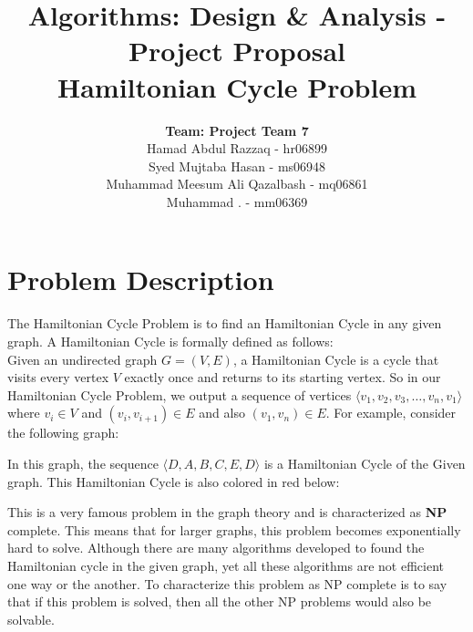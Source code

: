 \documentclass[12pt]{article}
\title{Algorithms: Design \& Analysis - Project Proposal\\\textbf{Hamiltonian Cycle Problem}}
\author{\textbf{Team: Project Team 7}\\Hamad Abdul Razzaq - hr06899 \\Syed Mujtaba Hasan - ms06948 \\Muhammad Meesum Ali Qazalbash - mq06861\\Muhammad . - mm06369}
\date{}
\begin{document}
\maketitle

\section*{Problem Description}
The Hamiltonian Cycle Problem is to find an Hamiltonian Cycle in any given graph. A Hamiltonian Cycle is formally defined as follows:\\
Given an undirected graph $G = \left(V, E\right)$, a Hamiltonian Cycle is a cycle that visits every vertex $V$ exactly once and returns to its starting vertex. So in our Hamiltonian Cycle Problem, we output a sequence of vertices $\langle v_1, v_2, v_3, \ldots, v_n, v_1 \rangle$ where $v_i \in V$ and $(v_i, v_{i+1}) \in E$ and also $(v_1, v_n) \in E$. For example, consider the following graph: \\
\begin{center}
\end{center}
In this graph, the sequence $\langle D, A, B, C, E, D\rangle$ is a Hamiltonian Cycle of the Given graph. This Hamiltonian Cycle is also colored in red below:
\begin{center}
\end{center}
This is a very famous problem in the graph theory and is characterized as \textbf{NP} complete. This means that for larger graphs, this problem becomes exponentially hard to solve. Although there are many algorithms developed to found the Hamiltonian cycle in the given graph, yet all these algorithms are not efficient one way or the another. To characterize this problem as NP complete is to say that if this problem is solved, then all the other NP problems would also be solvable.
\end{document}
